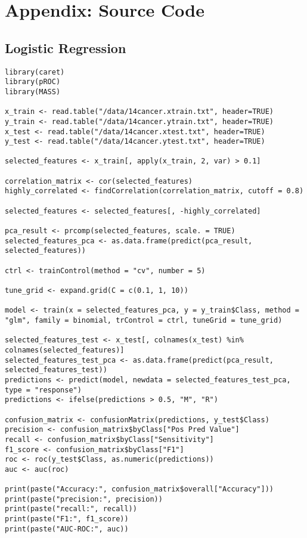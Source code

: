 \documentclass{article}
\begin{document}
\newpage

\appendix
\section{Appendix: Source Code}
\subsection{Logistic Regression}
\begin{lstlisting}
library(caret)
library(pROC)
library(MASS)

x_train <- read.table("/data/14cancer.xtrain.txt", header=TRUE)
y_train <- read.table("/data/14cancer.ytrain.txt", header=TRUE)
x_test <- read.table("/data/14cancer.xtest.txt", header=TRUE)
y_test <- read.table("/data/14cancer.ytest.txt", header=TRUE)

selected_features <- x_train[, apply(x_train, 2, var) > 0.1]

correlation_matrix <- cor(selected_features)
highly_correlated <- findCorrelation(correlation_matrix, cutoff = 0.8)

selected_features <- selected_features[, -highly_correlated]

pca_result <- prcomp(selected_features, scale. = TRUE)
selected_features_pca <- as.data.frame(predict(pca_result, selected_features))

ctrl <- trainControl(method = "cv", number = 5)

tune_grid <- expand.grid(C = c(0.1, 1, 10))

model <- train(x = selected_features_pca, y = y_train$Class, method = "glm", family = binomial, trControl = ctrl, tuneGrid = tune_grid)

selected_features_test <- x_test[, colnames(x_test) %in% colnames(selected_features)]
selected_features_test_pca <- as.data.frame(predict(pca_result, selected_features_test))
predictions <- predict(model, newdata = selected_features_test_pca, type = "response")
predictions <- ifelse(predictions > 0.5, "M", "R")

confusion_matrix <- confusionMatrix(predictions, y_test$Class)
precision <- confusion_matrix$byClass["Pos Pred Value"]
recall <- confusion_matrix$byClass["Sensitivity"]
f1_score <- confusion_matrix$byClass["F1"]
roc <- roc(y_test$Class, as.numeric(predictions))
auc <- auc(roc)

print(paste("Accuracy:", confusion_matrix$overall["Accuracy"]))
print(paste("precision:", precision))
print(paste("recall:", recall))
print(paste("F1:", f1_score))
print(paste("AUC-ROC:", auc))
\end{lstlisting}
\newpage
\end{document}
